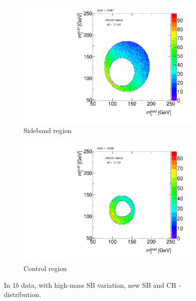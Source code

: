 \begin{figure}[htbp!]
\centering
\captionsetup{justification=centering}
    \begin{subfigure}[b]{0.39\textwidth}
        \includegraphics[width=\textwidth,angle=-90]{figures/boosted/Syst_CRSB/SB_High_Sideband_OneTag_mH0H1.pdf}
        \caption{Sideband region}
        \label{CRSB:SB_High_SB}
    \end{subfigure}
    \quad
    \begin{subfigure}[b]{0.39\textwidth}
        \includegraphics[width=\textwidth,angle=-90]{figures/boosted/Syst_CRSB/SB_High_Control_OneTag_mH0H1.pdf}
        \caption{Control region}
        \label{CRSB:SB_High_CR}
    \end{subfigure}
\caption{In $1b$ data, with high-mass SB variation, new SB and CR \mleadJ-\msublJ distribution.}
\label{CRSB:SB_High}
\end{figure}

